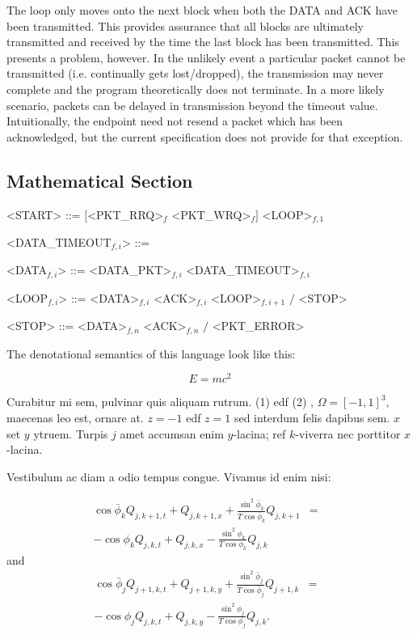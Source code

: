 \documentclass[a0,landscape]{a0poster}
\begin{document}
\begin{multicols}{4}
The loop only moves onto the next block when both the DATA and ACK have been transmitted. This provides assurance that all blocks are ultimately transmitted and received by the time the last block has been transmitted. This presents a problem, however. In the unlikely event a particular packet cannot be transmitted (i.e. continually gets lost/dropped), the transmission may never complete and the program theoretically does not terminate. In a more likely scenario, packets can be delayed in transmission beyond the timeout value. Intuitionally, the endpoint need not resend a packet which has been acknowledged, but the current specification does not provide for that exception.

\subsection*{Mathematical Section}

\begin{grammar}
<START> ::= $\big[$<PKT\_RRQ>$_{f}$ <PKT\_WRQ>$_{f}\big]$ <LOOP>$_{f,1}$

<DATA\_TIMEOUT$_{f,i}$> ::= 

<DATA$_{f,i}$> ::= <DATA\_PKT>$_{f,i}$ <DATA\_TIMEOUT>$_{f,i}$

<LOOP$_{f,i}$> ::= <DATA>$_{f,i}$ <ACK>$_{f,i}$ <LOOP>$_{f,i+1}$ $\big/$ <STOP>

<STOP> ::= <DATA>$_{f,n}$ <ACK>$_{f,n}$ $\big/$ <PKT\_ERROR>
\end{grammar}

The denotational semantics of this language look like this:
\begin{algorithmic}
\end{algorithmic}

\begin{equation}
E = mc^{2}
\label{eqn:Einstein}
\end{equation}

Curabitur mi sem, pulvinar quis aliquam rutrum. (1) edf (2)
, $\Omega=[-1,1]^3$, maecenas leo est, ornare at. $z=-1$ edf $z=1$ sed interdum felis dapibus sem. $x$ set $y$ ytruem. 
Turpis $j$ amet accumsan enim $y$-lacina; 
ref $k$-viverra nec porttitor $x$-lacina. 

Vestibulum ac diam a odio tempus congue. Vivamus id enim nisi:

\begin{eqnarray}
\cos\bar{\phi}_k Q_{j,k+1,t} + Q_{j,k+1,x}+\frac{\sin^2\bar{\phi}_k}{T\cos\bar{\phi}_k} Q_{j,k+1} &=&\nonumber\\ 
-\cos\phi_k Q_{j,k,t} + Q_{j,k,x}-\frac{\sin^2\phi_k}{T\cos\phi_k} Q_{j,k}\label{edgek}
\end{eqnarray}
and
\begin{eqnarray}
\cos\bar{\phi}_j Q_{j+1,k,t} + Q_{j+1,k,y}+\frac{\sin^2\bar{\phi}_j}{T\cos\bar{\phi}_j} Q_{j+1,k}&=&\nonumber \\
-\cos\phi_j Q_{j,k,t} + Q_{j,k,y}-\frac{\sin^2\phi_j}{T\cos\phi_j} Q_{j,k}.\label{edgej}
\end{eqnarray} 


\end{multicols}
\end{document}
